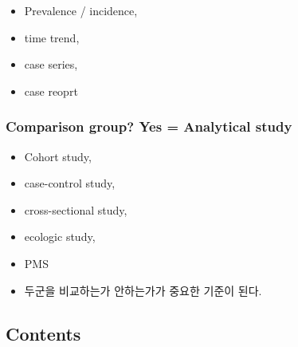 \documentclass[]{book}
\providecommand{\tightlist}{%
  \setlength{\itemsep}{0pt}\setlength{\parskip}{0pt}}
\begin{document}
\begin{itemize}
\tightlist
\item
  Prevalence / incidence,
\item
  time trend,
\item
  case series,
\item
  case reoprt
\end{itemize}

\subsubsection{Comparison group? Yes = Analytical
study}\label{comparison-group-yes-analytical-study}

\begin{itemize}
\tightlist
\item
  Cohort study,
\item
  case-control study,
\item
  cross-sectional study,
\item
  ecologic study,
\item
  PMS
\item
  두군을 비교하는가 안하는가가 중요한 기준이 된다.
\end{itemize}

\subsection{Contents}\label{contents-1}
\end{document}
